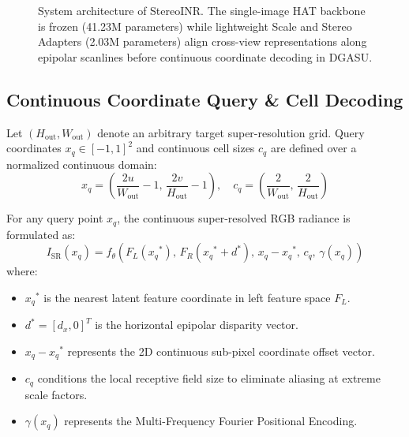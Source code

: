 \documentclass[10pt,journal,compsoc]{IEEEtran}
\begin{document}
\begin{figure}[!t]
{%
}
\caption{System architecture of StereoINR. The single-image HAT backbone is frozen (41.23M parameters) while lightweight Scale and Stereo Adapters (2.03M parameters) align cross-view representations along epipolar scanlines before continuous coordinate decoding in DGASU.}
\label{fig:tikz_architecture}
\end{figure}

\subsection{Continuous Coordinate Query \& Cell Decoding}
Let $(H_{\text{out}}, W_{\text{out}})$ denote an arbitrary target super-resolution grid. Query coordinates $x_q \in [-1, 1]^2$ and continuous cell sizes $c_q$ are defined over a normalized continuous domain:
\begin{equation}
x_q = \left( \frac{2u}{W_{\text{out}}} - 1, \, \frac{2v}{H_{\text{out}}} - 1 \right), \quad c_q = \left( \frac{2}{W_{\text{out}}}, \, \frac{2}{H_{\text{out}}} \right)
\label{eq:coord_norm}
\end{equation}

For any query point $x_q$, the continuous super-resolved RGB radiance is formulated as:
\begin{equation}
I_{\text{SR}}(x_q) = f_\theta\left( F_L({x_q}^*), \, F_R({x_q}^* + d^*), \, x_q - {x_q}^*, \, c_q, \, \gamma(x_q) \right)
\label{eq:stereoinr_decoding}
\end{equation}
where:
\begin{itemize}
    \item ${x_q}^*$ is the nearest latent feature coordinate in left feature space $F_L$.
    \item $d^* = [d_x, 0]^T$ is the horizontal epipolar disparity vector.
    \item $x_q - {x_q}^*$ represents the 2D continuous sub-pixel coordinate offset vector.
    \item $c_q$ conditions the local receptive field size to eliminate aliasing at extreme scale factors.
    \item $\gamma(x_q)$ represents the Multi-Frequency Fourier Positional Encoding.
\end{itemize}
\end{document}
